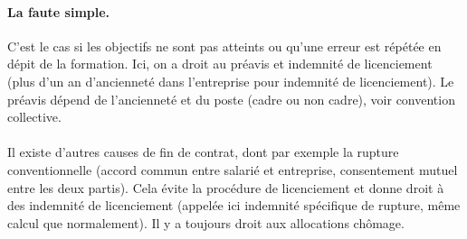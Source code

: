 \paragraph{La faute simple.}
C'est le cas si les objectifs ne sont pas atteints ou qu'une erreur est répétée en dépit de la formation.
Ici, on a droit au préavis et indemnité de licenciement (plus d’un an d’ancienneté dans l’entreprise pour indemnité de licenciement).
Le préavis dépend de l’ancienneté et du poste (cadre ou non cadre), voir convention collective.


\paragraph{}
Il existe d’autres causes de fin de contrat, dont par exemple la rupture conventionnelle (accord commun entre salarié et entreprise, consentement mutuel entre les deux partis).
Cela évite la procédure de licenciement et donne droit à des indemnité de licenciement (appelée ici indemnité spécifique de rupture, même calcul que normalement).
Il y a toujours droit aux allocations chômage.
